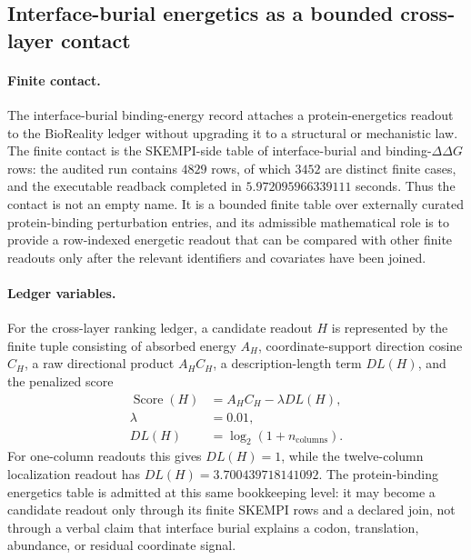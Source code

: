 \subsection{Interface-burial energetics as a bounded cross-layer contact}\label{subsec:bioreality-interface-burial-binding-ddg-skempi}

\paragraph{Finite contact.}
The interface-burial binding-energy record attaches a protein-energetics readout to the BioReality ledger without upgrading it to a structural or mechanistic law.  The finite contact is the SKEMPI-side table of interface-burial and binding-$\Delta\Delta G$ rows: the audited run contains $4829$ rows, of which $3452$ are distinct finite cases, and the executable readback completed in $5.972095966339111$ seconds.  Thus the contact is not an empty name.  It is a bounded finite table over externally curated protein-binding perturbation entries, and its admissible mathematical role is to provide a row-indexed energetic readout that can be compared with other finite readouts only after the relevant identifiers and covariates have been joined.

\paragraph{Ledger variables.}
For the cross-layer ranking ledger, a candidate readout $H$ is represented by the finite tuple consisting of absorbed energy $A_H$, coordinate-support direction cosine $C_H$, a raw directional product $A_H C_H$, a description-length term $DL(H)$, and the penalized score
$$
\begin{aligned}
  \operatorname{Score}(H) &= A_H C_H - \lambda DL(H), \\
  \lambda &= 0.01, \\
  DL(H) &= \log_2(1+n_{\mathrm{columns}}).
\end{aligned}
$$
For one-column readouts this gives $DL(H)=1$, while the twelve-column localization readout has $DL(H)=3.700439718141092$.  The protein-binding energetics table is admitted at this same bookkeeping level: it may become a candidate readout only through its finite SKEMPI rows and a declared join, not through a verbal claim that interface burial explains a codon, translation, abundance, or residual coordinate signal.

